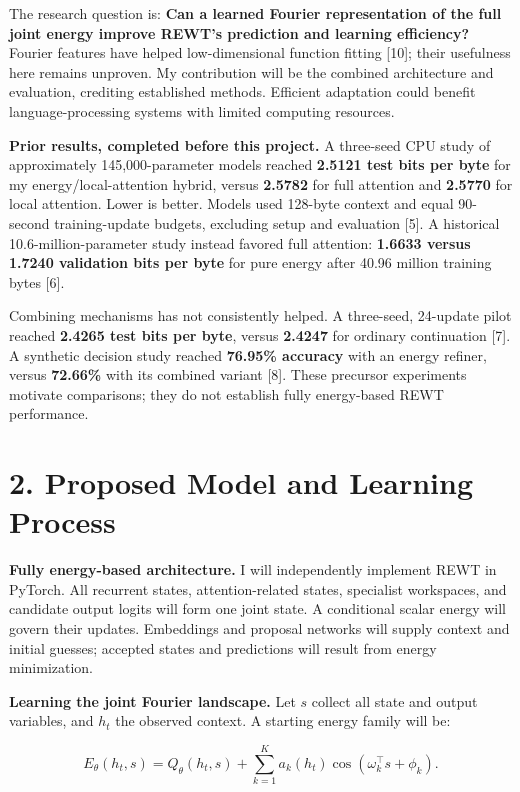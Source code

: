\documentclass[11pt,letterpaper]{article}
\begin{document}
The research question is: \textbf{Can a learned Fourier representation of the full joint energy improve REWT's prediction and learning efficiency?} Fourier features have helped low-dimensional function fitting [10]; their usefulness here remains unproven. My contribution will be the combined architecture and evaluation, crediting established methods. Efficient adaptation could benefit language-processing systems with limited computing resources.

\textbf{Prior results, completed before this project.} A three-seed CPU study of approximately 145,000-parameter models reached \textbf{2.5121 test bits per byte} for my energy/local-attention hybrid, versus \textbf{2.5782} for full attention and \textbf{2.5770} for local attention. Lower is better. Models used 128-byte context and equal 90-second training-update budgets, excluding setup and evaluation [5]. A historical 10.6-million-parameter study instead favored full attention: \textbf{1.6633 versus 1.7240 validation bits per byte} for pure energy after 40.96 million training bytes [6].

Combining mechanisms has not consistently helped. A three-seed, 24-update pilot reached \textbf{2.4265 test bits per byte}, versus \textbf{2.4247} for ordinary continuation [7]. A synthetic decision study reached \textbf{76.95\% accuracy} with an energy refiner, versus \textbf{72.66\%} with its combined variant [8]. These precursor experiments motivate comparisons; they do not establish fully energy-based REWT performance.

\newpage
\section*{2. Proposed Model and Learning Process}

\textbf{Fully energy-based architecture.} I will independently implement REWT in PyTorch. All recurrent states, attention-related states, specialist workspaces, and candidate output logits will form one joint state. A conditional scalar energy will govern their updates. Embeddings and proposal networks will supply context and initial guesses; accepted states and predictions will result from energy minimization.

\textbf{Learning the joint Fourier landscape.} Let \(s\) collect all state and output variables, and \(h_t\) the observed context. A starting energy family will be:

\[
E_\theta(h_t,s)=Q_\theta(h_t,s)+\sum_{k=1}^{K}a_k(h_t)\cos(\omega_k^\top s+\phi_k).
\]
\end{document}
